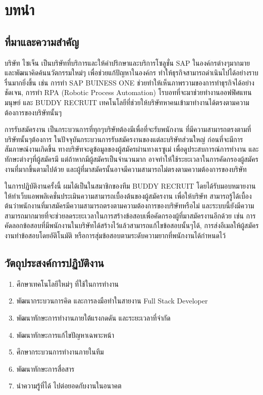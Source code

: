 \chapter{บทนำ}
\label{chapter:introduction}

\section{ที่มาและความสำคัญ}

บริษัท ไซเจ็น เป็นบริษัทที่บริการและให้คำปริกษาและบริการโซลูชั่น SAP ในองค์กรต่างๆมากมาย และพัฒนาคิดค้นนวัตกรรมใหม่ๆ เพื่อช่วยแก้ปัญหาในองค์กร ทำให้ธุรกิจสามารถดำเนินไปได้อย่างราบรื่นมากยิ่งขึ้น เช่น การทำ SAP BUINESS ONE ช่วยทำให้เห็นภาพรวามของการทำธุรกิจได้อย่างชัดเจน,  การทำ RPA (Robotic Process Automation) โรบอทที่จะมาช่วยทำงานออฟฟิศแทนมนุษย์ และ BUDDY RECRUIT เทคโนโลยีที่ช่วยให้บริษัทหาคนเข้ามาทำงานได้ตรงตามความต้องการของบริษัทนั้นๆ

การรับสมัครงาน เป็นกระบวนการที่ทุกๆบริษัทต้องมีเพื่อที่จะรับพนักงาน ที่มีความสามารถตรงตามที่บริษัทนั้นๆต้องการ ในปัจจุบันกระบวนการรับสมัครงานของแต่ละบริษัทส่วนใหญ่ ก่อนที่จะมีการสัมภาษณ์งานเกิดขึ้น ทางบริษัทจะดูข้อมูลของผู้สมัครผ่านทางเรซูเม่ เพื่อดูประสบการณ์การทำงาน และทักษะต่างๆที่ผู้สมัครมี แต่ถ้าหากมีผู้สมัครเป็นจำนวนมาก อาจทำให้ใช้ระยะเวลาในการคัดกรองผู้สมัครงานที่มากขึ้นตามไปด้วย และผู้ที่มาสมัครนั้นอาจมีความสามารถไม่ตรงตามความต้องการของบริษัท

ในการปฏิบัติงานครั้งนี้ ผมได้เป็นในสมาชิกของทีม BUDDY RECRUIT โดยได้รับมอบหมายงานให้ทำเว็บแอพพลิเคชั่นประเมินความสามารถเบื้องต้นของผู้สมัครงาน เพื่อให้บริษัท สามารถรู้ได้เบื้องต้นว่าพนักงานที่มาสมัครมีความสามารถตรงตามความต้องการของบริษัทหรือไม่ และระบบนี้ยังมีความสามารถมากมายที่จะช่วยลดระยะเวลาในการสร้างข้อสอบเพื่อคัดกรองผู้ที่มาสมัครงานอีกด้วย เช่น การคัดลอกข้อสอบที่มีพนักงานในบริษัทได้สร้างไว้แล้วสามารถแก้ไขข้อสอบนั้นๆได้, การส่งอีเมลให้ผู้สมัครงานทำข้อสอบโดยอัติโนมัติ หรือการสุ่มข้อสอบตามระดับความยากที่พนักงานได้กำหนดไว้

\section{วัตถุประสงค์การปฏิบัติงาน}

\begin{enumerate}
  \item ศึกษาเทคโนโลยีใหม่ๆ ที่ใช้ในการทำงาน
  \item พัฒนากระบวนการคิด และการลงมือทำในสายงาน Full Stack Developer
  \item พัฒนาทักษะการทำงานภายใต้แรงกดดัน และระยะเวลาที่จำกัด
  \item พัฒนาทักษะการแก้ไขปัญหาเฉพาะหน้า
  \item ศึกษากระบวนการทำงานภายในทีม
  \item พัฒนาทักษะการสื่อสาร
  \item นำความรู้ที่ได้ ไปต่อยอดกับงานในอนาคต
\end{enumerate}

